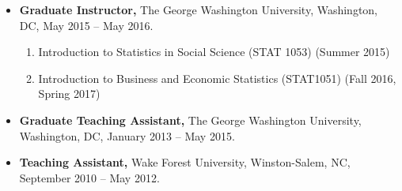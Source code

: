 \documentclass[margin]{res}
\begin{document}
\begin{resume}
\begin{itemize}
	\item {\bf Graduate Instructor,} The George Washington University, Washington, DC, May 2015 -- May 2016.
	\begin{enumerate}
		\item Introduction to Statistics in Social Science (STAT 1053) (Summer 2015)
		\item Introduction to Business and Economic Statistics (STAT1051) (Fall 2016, Spring 2017)
	\end{enumerate}
	
	\item{\bf Graduate Teaching Assistant,} The George Washington University, Washington, DC, January 2013 -- May 2015.
	
	\item{\bf Teaching Assistant,} Wake Forest University, Winston-Salem, NC, September 2010 -- May 2012.
\end{itemize}


\end{resume}
\end{document}
